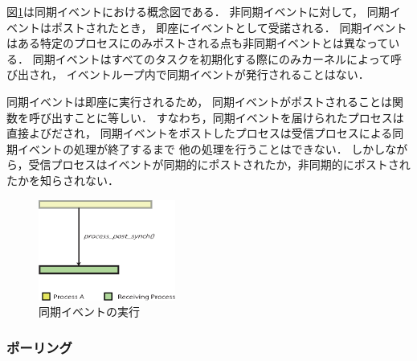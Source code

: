 \vspace{0.5em}図\ref{fig:synchronous_event}は同期イベントにおける概念図である．
非同期イベントに対して，
同期イベントはポストされたとき，
即座にイベントとして受諾される．
同期イベントはある特定のプロセスにのみポストされる点も非同期イベントとは異なっている．
同期イベントはすべてのタスクを初期化する際にのみカーネルによって呼び出され，
イベントループ内で同期イベントが発行されることはない．

同期イベントは即座に実行されるため，
同期イベントがポストされることは関数を呼び出すことに等しい．
すなわち，同期イベントを届けられたプロセスは直接よびだされ，
同期イベントをポストしたプロセスは受信プロセスによる同期イベントの処理が終了するまで
他の処理を行うことはできない．
しかしながら，受信プロセスはイベントが同期的にポストされたか，非同期的にポストされたかを知らされない．

\begin{figure}[htbp]
 \begin{center}
  \includegraphics[width=45mm]{./images/synchronous_event.eps}
 \end{center}
 \caption{同期イベントの実行}
 \label{fig:synchronous_event}
\end{figure}


\subsubsection{ポーリング}


